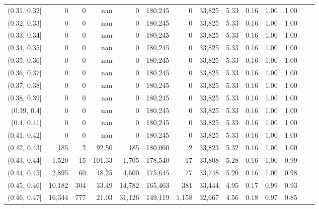\begin{tabular}{rrrrrrrrrrrrrr}
(0.31, 0.32]   &       0 &      0 &     nan &        0 &  180,245 &       0 &  33,825 &  5.33 &  0.16 &  1.00 &      1.00 \\
(0.32, 0.33]   &       0 &      0 &     nan &        0 &  180,245 &       0 &  33,825 &  5.33 &  0.16 &  1.00 &      1.00 \\
(0.33, 0.34]   &       0 &      0 &     nan &        0 &  180,245 &       0 &  33,825 &  5.33 &  0.16 &  1.00 &      1.00 \\
(0.34, 0.35]   &       0 &      0 &     nan &        0 &  180,245 &       0 &  33,825 &  5.33 &  0.16 &  1.00 &      1.00 \\
(0.35, 0.36]   &       0 &      0 &     nan &        0 &  180,245 &       0 &  33,825 &  5.33 &  0.16 &  1.00 &      1.00 \\
(0.36, 0.37]   &       0 &      0 &     nan &        0 &  180,245 &       0 &  33,825 &  5.33 &  0.16 &  1.00 &      1.00 \\
(0.37, 0.38]   &       0 &      0 &     nan &        0 &  180,245 &       0 &  33,825 &  5.33 &  0.16 &  1.00 &      1.00 \\
(0.38, 0.39]   &       0 &      0 &     nan &        0 &  180,245 &       0 &  33,825 &  5.33 &  0.16 &  1.00 &      1.00 \\
(0.39, 0.4]    &       0 &      0 &     nan &        0 &  180,245 &       0 &  33,825 &  5.33 &  0.16 &  1.00 &      1.00 \\
(0.4, 0.41]    &       0 &      0 &     nan &        0 &  180,245 &       0 &  33,825 &  5.33 &  0.16 &  1.00 &      1.00 \\
(0.41, 0.42]   &       0 &      0 &     nan &        0 &  180,245 &       0 &  33,825 &  5.33 &  0.16 &  1.00 &      1.00 \\
(0.42, 0.43]   &     185 &      2 &   92.50 &      185 &  180,060 &       2 &  33,823 &  5.32 &  0.16 &  1.00 &      1.00 \\
(0.43, 0.44]   &   1,520 &     15 &  101.33 &    1,705 &  178,540 &      17 &  33,808 &  5.28 &  0.16 &  1.00 &      0.99 \\
(0.44, 0.45]   &   2,895 &     60 &   48.25 &    4,600 &  175,645 &      77 &  33,748 &  5.20 &  0.16 &  1.00 &      0.98 \\
(0.45, 0.46]   &  10,182 &    304 &   33.49 &   14,782 &  165,463 &     381 &  33,444 &  4.95 &  0.17 &  0.99 &      0.93 \\
(0.46, 0.47]   &  16,344 &    777 &   21.03 &   31,126 &  149,119 &   1,158 &  32,667 &  4.56 &  0.18 &  0.97 &      0.85 \\

\end{tabular}
